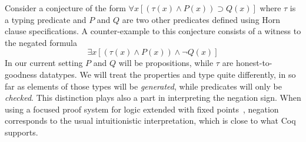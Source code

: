 Consider a conjecture of the form
\(\forall x [(\tau(x)\wedge P(x)) \supset Q(x)]\) where $\tau$ is a
typing predicate and $P$ and $Q$ are two other predicates defined
using Horn clause specifications.  A counter-example to this conjecture
consists of a witness to the negated formula
\[
  \exists x [(\tau(x)\wedge P(x)) \wedge \neg Q(x)]
  \tag{*}\label{eq:full}
\]
%
In our current setting $P$ and $Q$ will be 
propositions, while $\tau$   are honest-to-goodness datatypes. We will
treat the properties and type quite differently, in so far as elements of those types will be \emph{generated}, while predicates will only be \emph{checked}. This distinction plays also a part in interpreting the negation sign.
%
When using a focused proof system for logic extended with fixed
points~\cite{baelde12tocl}, negation corresponds to the usual
intuitionistic interpretation, which is close to what Coq supports.  %

